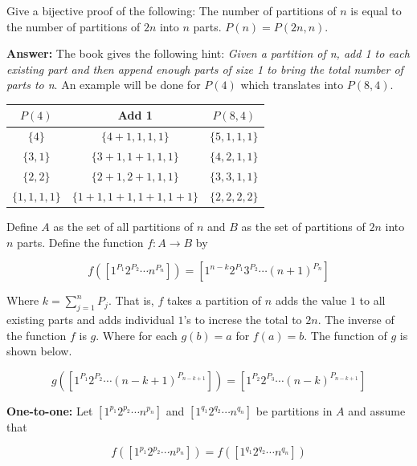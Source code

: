 \documentclass{article}
\begin{document}
\begin{problem} %
Give a bijective proof of the following: The number of partitions of $n$ is equal to the number of partitions of $2n$ into $n$ parts. $P(n) = P(2n, n)$.
\end{problem}

\textbf{Answer:}
The book gives the following hint: \textit{Given a partition of n, add 1 to each existing part and then append enough parts of size 1 to bring the total number of parts to n}. An example will be done for $P(4)$ which translates into $P(8, 4)$.

\begin{center}
\begin{tabular}{ |c|c|c| } 
\hline
$P(4)$ & Add 1 & $P(8,4)$ \\
\hline
$\{4\}$ & $\{4+1, 1, 1, 1\}$ & $\{5,1,1,1\}$ \\
$\{3,1\}$ & $\{3+1,1+1,1, 1\}$ & $\{4, 2, 1, 1\}$ \\
$\{2,2\}$ & $\{2+1,2+1,1,1\}$ & $\{3, 3, 1, 1\}$ \\
$\{1,1,1,1\}$ & $\{1+1,1+1,1+1,1+1\}$ & $\{2,2,2,2\}$ \\
\hline
\end{tabular}
\end{center}

Define $A$ as the set of all partitions of $n$ and $B$ as the set of partitions of $2n$ into $n$ parts. Define the function $f: A \rightarrow B$ by

\begin{equation*}
    f([1^{P_1}2^{P_2}\cdots n^{P_n}]) = [1^{n-k}2^{P_1}3^{P_2}\cdots (n+1)^{P_n}]
\end{equation*}

Where $k = \sum_{j=1}^{n} P_j$. That is, $f$ takes a partition of $n$ adds the value $1$ to all existing parts and adds individual $1$'s to increse the total to $2n$. The inverse of the function $f$ is $g$. Where for each $g(b) = a$ for $f(a) = b$. The function of $g$ is shown below.

\begin{equation*}
    g([1^{P_1}2^{P_2}\cdots (n-k+1)^{P_{n-k+1}}]) = [1^{P_2} 2^{P_3} \cdots (n-k)^{P_{n-k+1}}]
\end{equation*}

\medskip
\textbf{One-to-one:} Let $[1^{p_1}2^{p_2}\cdots n^{p_n}]$ and $[1^{q_1}2^{q_2}\cdots n^{q_n}]$ be partitions in $A$ and assume that 

\begin{equation*}
   f([1^{p_1}2^{p_2}\cdots n^{p_n}]) = f([1^{q_1}2^{q_2}\cdots n^{q_n}]) 
\end{equation*}
\end{document}
